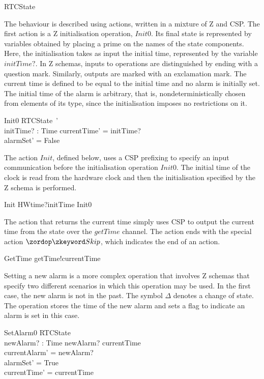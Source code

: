 \begin{circusaction}
  \circstate RTCState
\end{circusaction}
%
The behaviour is described using actions, written in a mixture of Z
and CSP.
The first action is a Z initialisation operation, $Init0$.
Its final state is represented by variables obtained by placing a
prime on the names of the state components.
Here, the initialisation takes as input the initial time, represented
by the variable $initTime?$.
In Z schemas, inputs to operations are distinguished by ending with a
question mark.
Similarly, outputs are marked with an exclamation mark.
The current time is defined to be equal to the initial time and no
alarm is initially set.
The initial time of the alarm is arbitrary, that is,
nondeterministically chosen from elements of its type, since the
initialisation imposes no restrictions on it.
%
\begin{schema}{Init0}
  RTCState~' \\
  initTime? : Time
\where 
  currentTime' = initTime? \\
  alarmSet' = False
\end{schema}
%
The action $Init$, defined below, uses a CSP prefixing to specify an
input communication before the initialisation operation $Init0$.
The initial time of the clock is read from the hardware clock and then
the initialisation specified by the Z schema is performed.
%
\begin{circusaction}
  Init \circdef HWtime?initTime \then \lschexpract Init0 \rschexpract
\end{circusaction}
%
The action that returns the current time simply uses CSP to output the
current time from the state over the $getTime$ channel.
The action ends with the special action $\Skip$, which indicates the
end of an action.
%
\begin{circusaction}
  GetTime \circdef getTime!currentTime \then \Skip
\end{circusaction}
%
Setting a new alarm is a more complex operation that involves Z
schemas that specify two different scenarios in which this operation
may be used.
In the first case, the new alarm is not in the past.
The symbol $\Delta$ denotes a change of state.
The operation stores the time of the new alarm and sets a flag to
indicate an alarm is set in this case.
%
\begin{schema}{SetAlarm0}
  \Delta RTCState \\
  newAlarm? : Time
\where
  newAlarm? \geq currentTime \\
  currentAlarm' = newAlarm?{} \\
  alarmSet' = True \\
  currentTime' = currentTime
\end{schema}
